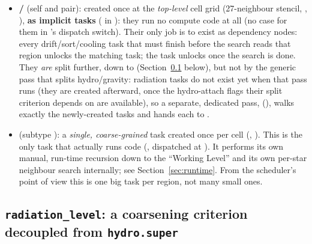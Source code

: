 \begin{itemize}
  \item \textbf{ /
    } (self and pair): created once at the
    \emph{top-level} cell grid (27-neighbour stencil,
    ,
    ), \textbf{as implicit tasks}
    ( in ): they run no
    compute code at all (no case for them in 's
    dispatch switch). Their only job is to exist as dependency nodes:
    every drift/sort/cooling task that must finish before the search
    reads that region unlocks the matching  task; the
     task unlocks  once the search is
    done. They \emph{are} split further, down to
     (Section~\ref{sec:radiation-level} below),
    but not by the generic  pass that splits
    hydro/gravity: radiation tasks do not exist yet when that pass
    runs (they are created afterward, once the hydro-attach flags
    their split criterion depends on are available), so a separate,
    dedicated pass, 
    (), walks exactly the
    newly-created  tasks and hands each to
    .
  \item \textbf{}
    (subtype ): a \emph{single, coarse-grained} task
    created once per  cell
    (,
    ). This is the only task that
    actually runs code (, dispatched at ).
    It performs its own manual, run-time recursion down to the
    ``Working Level'' and its own per-star neighbour search internally;
    see Section~\ref{sec:runtime}. From the scheduler's point of
    view this is one big task per region, not many small ones.
\end{itemize}

\subsection{\texttt{radiation\_level}: a coarsening criterion decoupled from \texttt{hydro.super}}
\label{sec:radiation-level}

